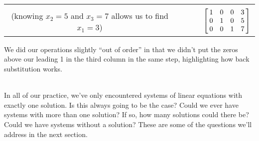 {\begin{center}
\begin{tabular}{ccl}
{$-\frac12R_2+R_1\rightarrow R_1$\\

(knowing $x_2=5$ and $x_3=7$ allows us to find $x_1 = 3$)}
&$\quad \quad$&
$\bmx{cccc}1&0&0&3\\0&1&0&5\\0&0&1&7\\ \emx$
\end{tabular}\end{center}

We did our operations slightly ``out of order'' in that we didn't put the zeros above our leading 1 in the third column in the same step, highlighting how back substitution works. }\\ %

In all of our practice, we've only encountered systems of linear equations with exactly one solution. Is this always going to be the case? Could we ever have systems with more than one solution? If so, how many solutions could there be? Could we have systems without a solution? These are some of the questions we'll address in the next section.\\
 


